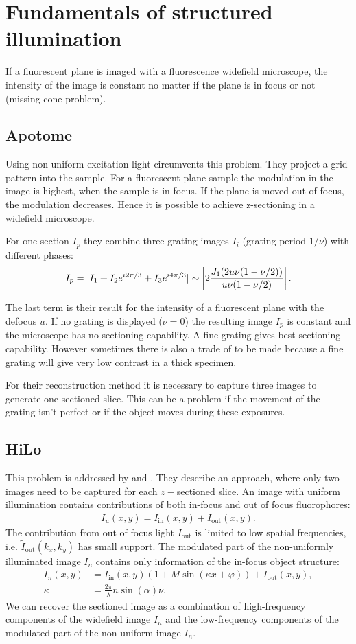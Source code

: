 \section{Fundamentals of structured illumination}
If a fluorescent plane is imaged with a fluorescence widefield
microscope, the intensity of the image is constant no matter if the
plane is in focus or not (missing cone problem). 
\subsection{Apotome}
Using non-uniform excitation light \cite{Neil1997} circumvents this
problem. They project a grid pattern into the sample. For a
fluorescent plane sample the modulation in the image is highest, when
the sample is in focus. If the plane is moved out of focus, the
modulation decreases. Hence it is possible to achieve z-sectioning in
a widefield microscope.

For one section $I_p$ they combine three grating images $I_i$ (grating
period $1/\nu$) with different phases:
\begin{align}
  I_p=\mathopen| I_1+I_2e^{i2\pi/3}+I_3e^{i4\pi/3} \mathclose|
  \sim\left| 2 \frac{J_1(2u\nu(1-\nu/2))}{u\nu(1-\nu/2)}\right|.
\end{align}

The last term is their result for the intensity of a fluorescent plane
with the defocus $u$. If no grating is displayed ($\nu=0$) the
resulting image $I_p$ is constant and the microscope has no sectioning
capability. A fine grating gives best sectioning capability. However
sometimes there is also a trade of to be made because a fine grating
will give very low contrast in a thick specimen.

For their reconstruction method it is necessary to capture three
images to generate one sectioned slice. This can be a problem if the
movement of the grating isn't perfect or if the object moves during
these exposures.
\subsection{HiLo}
This problem is addressed by \cite{2008Lim} and
\cite{2009Santos}. They describe an approach, where only two images
need to be captured for each $z-$sectioned slice.  An image with
uniform illumination contains contributions of both in-focus and out
of focus fluorophores:
\begin{align}
\label{eqn:Iu}
  I_u(x,y)=I_\textrm{in}(x,y)+I_\textrm{out}(x,y).
\end{align}
The contribution from out of focus light $I_\textrm{out}$ is limited
to low spatial frequencies, i.e. $\tilde I_\textrm{out}(k_x,k_y)$ has
small support. The modulated part of the non-uniformly illuminated
image $I_n$ contains only information of the in-focus object
structure:
\begin{align}
\label{eqn:In}
  I_n(x,y)&=I_\textrm{in}(x,y)(1+M
  \sin(\kappa x+\varphi))+I_\textrm{out}(x,y),\\
  \kappa&=\frac{2\pi}{\lambda}n\sin(\alpha)\nu.
\end{align}
We can recover the sectioned image as a combination of high-frequency
components of the widefield image $I_u$ and the low-frequency
components of the modulated part of the non-uniform image $I_n$.
